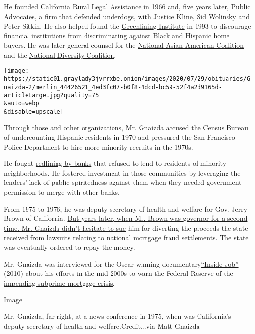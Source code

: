 He founded California Rural Legal Assistance in 1966 and, five years
later, \href{https://www.publicadvocates.org/}{Public Advocates}, a firm
that defended underdogs, with Justice Kline, Sid Wolinsky and Peter
Sitkin. He also helped found the
\href{https://greenlining.org/}{Greenlining Institute} in 1993 to
discourage financial institutions from discriminating against Black and
Hispanic home buyers. He was later general counsel for the
\href{https://www.naac.org/}{National Asian American Coalition} and the
\href{https://www.nationaldiversitycoalition.org/}{National Diversity
Coalition}.

\texttt{[image: https://static01.graylady3jvrrxbe.onion/images/2020/07/29/obituaries/Gnaizda-2/merlin\_44426521\_4ed3fc07-b0f8-4dcd-bc59-52f4a2d9165d-articleLarge.jpg?quality=75\\\&auto=webp\\\&disable=upscale]}

Through those and other organizations, Mr. Gnaizda accused the Census
Bureau of undercounting Hispanic residents in 1970 and pressured the San
Francisco Police Department to hire more minority recruits in the 1970s.

He fought
\href{https://www.nytimes3xbfgragh.onion/2017/08/24/upshot/how-redlinings-racist-effects-lasted-for-decades.html}{redlining
by banks} that refused to lend to residents of minority neighborhoods.
He fostered investment in those communities by leveraging the lenders'
lack of public-spiritedness against them when they needed government
permission to merge with other banks.

From 1975 to 1976, he was deputy secretary of health and welfare for
Gov. Jerry Brown of California.
\href{https://www.nytimes3xbfgragh.onion/2014/03/15/business/california-sued-over-diversion-of-money-from-national-mortgage-settlement.html}{But
years later, when Mr. Brown was governor for a second time. Mr. Gnaizda
didn't hesitate to sue} him for diverting the proceeds the state
received from lawsuits relating to national mortgage fraud settlements.
The state was eventually ordered to repay the money.

Mr. Gnaizda was interviewed for the Oscar-winning
documentary\href{https://www.nytimes3xbfgragh.onion/2010/10/08/movies/08inside.html}{``Inside
Job''} (2010) about his efforts in the mid-2000s to warn the Federal
Reserve of the
\href{https://www.nytimes3xbfgragh.onion/2007/12/18/business/18subprime.html}{impending
subprime mortgage crisis}.

Image

Mr. Gnaizda, far right, at a news conference in 1975, when was
California's deputy secretary of health and welfare.Credit...via Matt
Gnaizda

